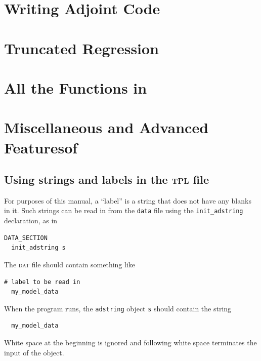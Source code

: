 \documentclass{admbmanual}
\begin{document}
\chapter{Writing Adjoint Code}
 \x

%

% 

\chapter{Truncated Regression}
 \x

\chapter{All the Functions in \ADM}

\chapter{Miscellaneous and Advanced Features\br of \ADM}

\section{Using strings and labels in the \textsc{tpl} file}

For purposes of this manual, a ``label'' is a string that does not have any
blanks in it. Such strings can be read in from the \texttt{data} file using the
\texttt{init\_adstring} declaration, as in
\begin{lstlisting}
DATA_SECTION
  init_adstring s
\end{lstlisting}
The \textsc{dat} file should contain something like
\begin{lstlisting}
# label to be read in
  my_model_data
\end{lstlisting}
When the program runs, the \texttt{adstring} object \texttt{s} should contain
the string
\begin{lstlisting}
  my_model_data
\end{lstlisting}
White space at the beginning is ignored and following white space terminates the
input of the object.
\end{document}
